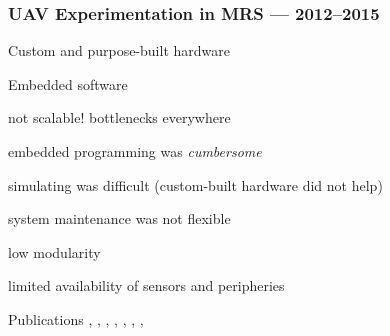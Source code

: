 \documentclass[aspectratio=169]{beamer}
\begin{document}
\begin{frame}
  \frametitle{UAV Experimentation in MRS --- 2012--2015}

  \begin{itemize}
    \item Custom and purpose-built hardware
    \item Embedded software
    {\color{red} \item not scalable! bottlenecks everywhere
    \item embedded programming was \emph{cumbersome}
    \item simulating was difficult (custom-built hardware did not help)
    \item system maintenance was not flexible
    \item low modularity
    \item limited availability of sensors and peripheries}
  \end{itemize}

  \begin{block}{Publications}
    \cite{saska2013adhoc}, \cite{chudoba2014localization}, \cite{baca2016embedded}, \cite{saska2017documentation}, \cite{chudoba2016exploration}, \cite{saska2016formations}, \cite{spurny2016complex}, \cite{saska2017system}
  \end{block}

\end{frame}


\end{document}
